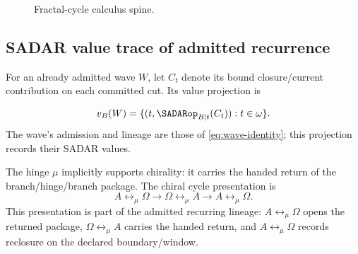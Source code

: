 \begin{figure}[H]
\centering
{}
\caption{Fractal-cycle calculus spine.}
\label{fig:fractal-calculus-spine}
\end{figure}\subsection{SADAR value trace of admitted recurrence}
\label{subsec:cycle-wave-identity}
For an already admitted wave \(W\), let \(C_t\) denote its bound
closure/current contribution on each committed cut. Its value projection is

\begin{equation}
v_B(W)=\{(t,\SADARop_{B|t}(C_t)):t\in\omega\}.
\label{eq:wave-sadar-presentation}
\end{equation}
The wave's admission and lineage are those of \eqref{eq:wave-identity}; this
projection records their SADAR values.

The hinge \(\mu\) implicitly supports chirality: it carries the handed return of the branch/hinge/branch package. The chiral cycle presentation is
\begin{equation}
A\leftrightarrow_{\mu}\Omega\rightarrow\Omega\leftrightarrow_{\mu}A\rightarrow A\leftrightarrow_{\mu}\Omega.
\label{eq:ao-chiral-cycle-presentation}
\end{equation}
This presentation is part of the admitted recurring lineage: \(A\leftrightarrow_{\mu}\Omega\) opens the returned package, \(\Omega\leftrightarrow_{\mu}A\) carries the handed return, and \(A\leftrightarrow_{\mu}\Omega\) records reclosure on the declared boundary/window.

